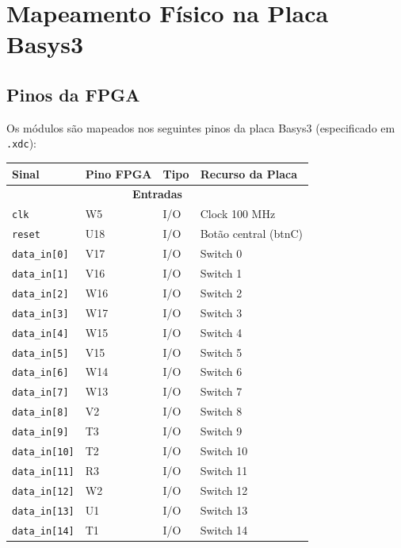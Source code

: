 \documentclass[11pt,a4paper]{article}
\begin{document}
\section{Mapeamento Físico na Placa Basys3}

\subsection{Pinos da FPGA}

Os módulos são mapeados nos seguintes pinos da placa Basys3 (especificado em \texttt{.xdc}):

\begin{table}[H]
\centering
\begin{tabularx}{\textwidth}{|l|l|l|l|}
\hline
\textbf{Sinal} & \textbf{Pino FPGA} & \textbf{Tipo} & \textbf{Recurso da Placa} \\
\hline
\multicolumn{4}{|c|}{\textbf{Entradas}} \\
\hline
\texttt{clk} & W5 & I/O & Clock 100 MHz \\
\hline
\texttt{reset} & U18 & I/O & Botão central (btnC) \\
\hline
\texttt{data\_in[0]} & V17 & I/O & Switch 0 \\
\hline
\texttt{data\_in[1]} & V16 & I/O & Switch 1 \\
\hline
\texttt{data\_in[2]} & W16 & I/O & Switch 2 \\
\hline
\texttt{data\_in[3]} & W17 & I/O & Switch 3 \\
\hline
\texttt{data\_in[4]} & W15 & I/O & Switch 4 \\
\hline
\texttt{data\_in[5]} & V15 & I/O & Switch 5 \\
\hline
\texttt{data\_in[6]} & W14 & I/O & Switch 6 \\
\hline
\texttt{data\_in[7]} & W13 & I/O & Switch 7 \\
\hline
\texttt{data\_in[8]} & V2 & I/O & Switch 8 \\
\hline
\texttt{data\_in[9]} & T3 & I/O & Switch 9 \\
\hline
\texttt{data\_in[10]} & T2 & I/O & Switch 10 \\
\hline
\texttt{data\_in[11]} & R3 & I/O & Switch 11 \\
\hline
\texttt{data\_in[12]} & W2 & I/O & Switch 12 \\
\hline
\texttt{data\_in[13]} & U1 & I/O & Switch 13 \\
\hline
\texttt{data\_in[14]} & T1 & I/O & Switch 14 \\

\end{tabularx}
\end{table}
\end{document}

